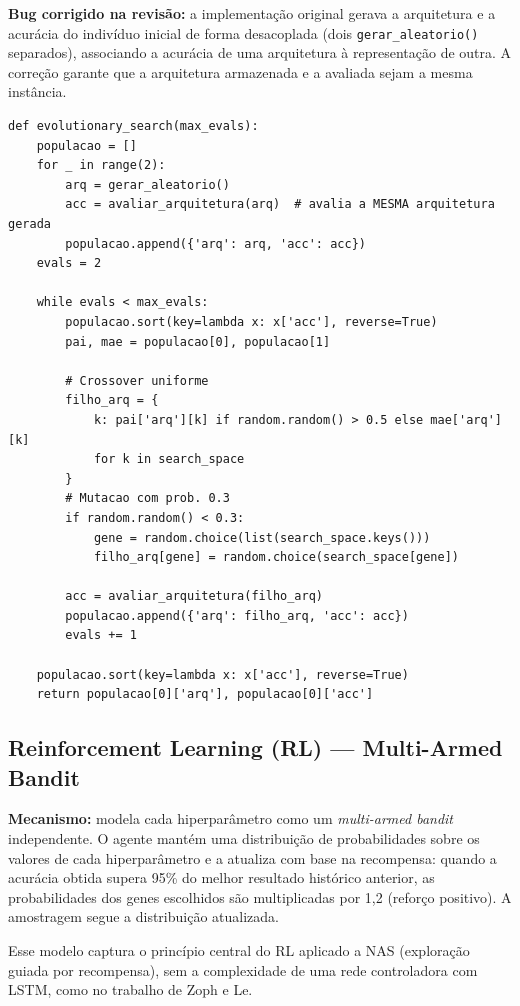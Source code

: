 \documentclass[a4paper,12pt]{article}
\begin{document}
\textbf{Bug corrigido na revisão:} a implementação original gerava a arquitetura e a acurácia do indivíduo inicial de forma desacoplada (dois \texttt{gerar\_aleatorio()} separados), associando a acurácia de uma arquitetura à representação de outra. A correção garante que a arquitetura armazenada e a avaliada sejam a mesma instância.

\begin{lstlisting}[style=python, caption={Evolutionary Algorithm.}]
def evolutionary_search(max_evals):
    populacao = []
    for _ in range(2):
        arq = gerar_aleatorio()
        acc = avaliar_arquitetura(arq)  # avalia a MESMA arquitetura gerada
        populacao.append({'arq': arq, 'acc': acc})
    evals = 2

    while evals < max_evals:
        populacao.sort(key=lambda x: x['acc'], reverse=True)
        pai, mae = populacao[0], populacao[1]

        # Crossover uniforme
        filho_arq = {
            k: pai['arq'][k] if random.random() > 0.5 else mae['arq'][k]
            for k in search_space
        }
        # Mutacao com prob. 0.3
        if random.random() < 0.3:
            gene = random.choice(list(search_space.keys()))
            filho_arq[gene] = random.choice(search_space[gene])

        acc = avaliar_arquitetura(filho_arq)
        populacao.append({'arq': filho_arq, 'acc': acc})
        evals += 1

    populacao.sort(key=lambda x: x['acc'], reverse=True)
    return populacao[0]['arq'], populacao[0]['acc']
\end{lstlisting}

\subsection{Reinforcement Learning (RL) — Multi-Armed Bandit}

\textbf{Mecanismo:} modela cada hiperparâmetro como um \textit{multi-armed bandit} independente. O agente mantém uma distribuição de probabilidades sobre os valores de cada hiperparâmetro e a atualiza com base na recompensa: quando a acurácia obtida supera 95\% do melhor resultado histórico anterior, as probabilidades dos genes escolhidos são multiplicadas por 1,2 (reforço positivo). A amostragem segue a distribuição atualizada.

Esse modelo captura o princípio central do RL aplicado a NAS (exploração guiada por recompensa), sem a complexidade de uma rede controladora com LSTM, como no trabalho de Zoph e Le.
\end{document}
